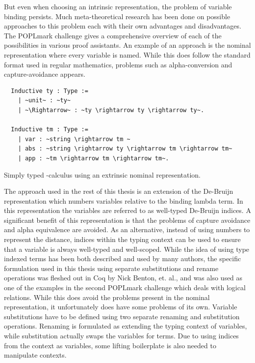 \documentclass[11pt, final]{article}
\begin{document}
But even when choosing an intrinsic representation, the problem of variable binding persists.
Much meta-theoretical research has been done on possible approaches to this problem each with their own advantages and disadvantages.
The POPLmark challenge gives a comprehensive overview of each of the possibilities in various proof assistants\cite{Aydemir2005}.
An example of an approach is the nominal representation where every variable is named.
While this does follow the standard format used in regular mathematics, problems such as alpha-conversion and capture-avoidance appears.

\begin{listing}[h]
  \begin{verbatim}
  Inductive ty : Type :=
    | ~unit~ : ~ty~
    | ~\Rightarrow~ : ~ty \rightarrow ty \rightarrow ty~.

  Inductive tm : Type :=
    | var : ~string \rightarrow tm ~
    | abs : ~string \rightarrow ty \rightarrow tm \rightarrow tm~
    | app : ~tm \rightarrow tm \rightarrow tm~.
  \end{verbatim}
  \caption{Simply typed \lambda-calculus using an extrinsic nominal representation.}
  \label{lst:nominal_stlc}
\end{listing}

The approach used in the rest of this thesis is an extension of the De-Bruijn representation which numbers variables relative to the binding lambda term.
In this representation the variables are referred to as well-typed De-Bruijn indices.
A significant benefit of this representation is that the problems of capture avoidance and alpha equivalence are avoided.
As an alternative, instead of using numbers to represent the distance, indices within the typing context can be used to ensure that a variable is always well-typed and well-scoped.
While the idea of using type indexed terms has been both described and used by many authors\cite{Altenkirch99}\cite{McBride04}\cite{Adams06}, the specific formulation used in this thesis using separate substitutions and rename operations was fleshed out in Coq by Nick Benton, et. al.\cite{Benton2011}, and was also used as one of the examples in the second POPLmark challenge which deals with logical relations\cite{poplmark_reloaded}.
While this does avoid the problems present in the nominal representation, it unfortunately does have some problems of its own.
Variable substitutions have to be defined using two separate renaming and substitution operations.
Renaming is formulated as extending the typing context of variables, while substitution actually swaps the variables for terms.
Due to using indices from the context as variables, some lifting boilerplate is also needed to manipulate contexts.
\end{document}
